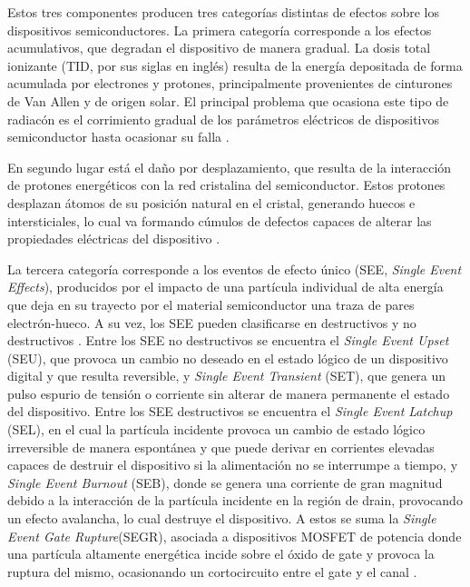 Estos tres componentes producen tres categorías distintas de efectos sobre los dispositivos semiconductores. La primera categoría corresponde a los efectos acumulativos, que degradan el dispositivo de manera gradual. La dosis total ionizante (TID, por sus siglas en inglés) resulta de la energía depositada de forma acumulada por electrones y protones, principalmente provenientes de cinturones de Van Allen y de origen solar. El principal problema que ocasiona este tipo de radiacón es el corrimiento gradual de los parámetros eléctricos de dispositivos semiconductor hasta ocasionar su falla \cite{mikaelian2001}. 

En segundo lugar está el daño por desplazamiento, que resulta de la interacción de protones energéticos con la red cristalina del semiconductor. Estos protones desplazan átomos de su posición natural en el cristal, generando huecos e intersticiales, lo cual va formando cúmulos de defectos capaces de alterar las propiedades eléctricas del dispositivo \cite{mikaelian2001}.
 
La tercera categoría corresponde a los eventos de efecto único (SEE, \textit{Single Event Effects}), producidos por el impacto de una partícula individual de alta energía que deja en su trayecto por el material semiconductor una traza de pares electrón-hueco. A su vez, los SEE pueden clasificarse en destructivos y no destructivos \cite{lauenstein2015}. Entre los SEE no destructivos se encuentra el \textit{Single Event Upset} (SEU), que provoca un cambio no deseado en el estado lógico de un dispositivo digital y que resulta reversible, y \textit{Single Event Transient} (SET), que genera un pulso espurio de tensión o corriente sin alterar de manera permanente el estado del dispositivo. Entre los SEE destructivos se encuentra el \textit{Single Event Latchup} (SEL), en el cual la partícula incidente provoca un cambio de estado lógico irreversible de manera espontánea y que puede derivar en corrientes elevadas capaces de destruir el dispositivo si la alimentación no se interrumpe a tiempo, y \textit{Single Event Burnout} (SEB), donde se genera una corriente de gran magnitud debido a la interacción de la partícula incidente en la región de drain, provocando un efecto avalancha, lo cual destruye el dispositivo. A estos se suma la \textit{Single Event Gate Rupture}(SEGR), asociada a dispositivos MOSFET de potencia donde una partícula altamente energética incide sobre el óxido de gate y provoca la ruptura del mismo, ocasionando un cortocircuito entre el gate y el canal \cite{mikaelian2001}.

